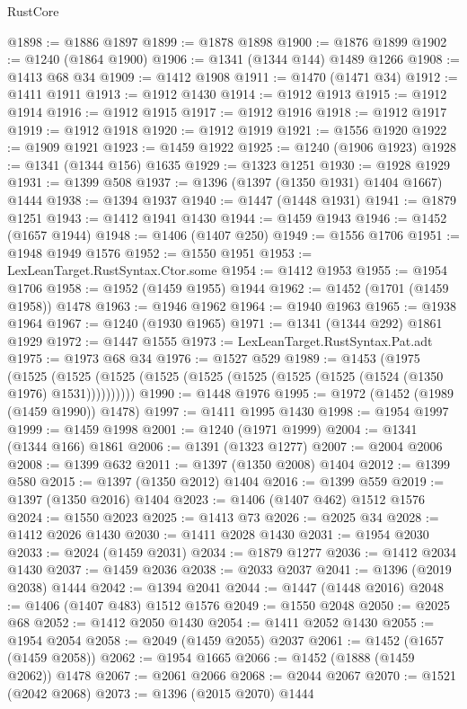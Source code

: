 \begin{lexlean}{RustCore}
\begin{coremodule}
{\begin{coremodule}
{{{{{{{{{{{{{{{{{{{{{{{{{{{{{{{{{{{{{{{{{{{{{@1898 := @1886 @1897
@1899 := @1878 @1898
@1900 := @1876 @1899
@1902 := @1240 (@1864 @1900)
@1906 := @1341 (@1344 @144) @1489 @1266
@1908 := @1413 @68 @34
@1909 := @1412 @1908
@1911 := @1470 (@1471 @34)
@1912 := @1411 @1911
@1913 := @1912 @1430
@1914 := @1912 @1913
@1915 := @1912 @1914
@1916 := @1912 @1915
@1917 := @1912 @1916
@1918 := @1912 @1917
@1919 := @1912 @1918
@1920 := @1912 @1919
@1921 := @1556 @1920
@1922 := @1909 @1921
@1923 := @1459 @1922
@1925 := @1240 (@1906 @1923)
@1928 := @1341 (@1344 @156) @1635
@1929 := @1323 @1251
@1930 := @1928 @1929
@1931 := @1399 @508
@1937 := @1396 (@1397 (@1350 @1931) @1404 @1667) @1444
@1938 := @1394 @1937
@1940 := @1447 (@1448 @1931)
@1941 := @1879 @1251
@1943 := @1412 @1941 @1430
@1944 := @1459 @1943
@1946 := @1452 (@1657 @1944)
@1948 := @1406 (@1407 @250)
@1949 := @1556 @1706
@1951 := @1948 @1949 @1576
@1952 := @1550 @1951
@1953 := LexLeanTarget.RustSyntax.Ctor.some
@1954 := @1412 @1953
@1955 := @1954 @1706
@1958 := @1952 (@1459 @1955) @1944
@1962 := @1452 (@1701 (@1459 @1958)) @1478
@1963 := @1946 @1962
@1964 := @1940 @1963
@1965 := @1938 @1964
@1967 := @1240 (@1930 @1965)
@1971 := @1341 (@1344 @292) @1861 @1929
@1972 := @1447 @1555
@1973 := LexLeanTarget.RustSyntax.Pat.adt
@1975 := @1973 @68 @34
@1976 := @1527 @529
@1989 := @1453
    (@1975
      (@1525 (@1525 (@1525 (@1525 (@1525 (@1525 (@1525 (@1525 (@1524 (@1350 @1976) @1531))))))))))
@1990 := @1448 @1976
@1995 := @1972 (@1452 (@1989 (@1459 @1990)) @1478)
@1997 := @1411 @1995 @1430
@1998 := @1954 @1997
@1999 := @1459 @1998
@2001 := @1240 (@1971 @1999)
@2004 := @1341 (@1344 @166) @1861
@2006 := @1391 (@1323 @1277)
@2007 := @2004 @2006
@2008 := @1399 @632
@2011 := @1397 (@1350 @2008) @1404
@2012 := @1399 @580
@2015 := @1397 (@1350 @2012) @1404
@2016 := @1399 @559
@2019 := @1397 (@1350 @2016) @1404
@2023 := @1406 (@1407 @462) @1512 @1576
@2024 := @1550 @2023
@2025 := @1413 @73
@2026 := @2025 @34
@2028 := @1412 @2026 @1430
@2030 := @1411 @2028 @1430
@2031 := @1954 @2030
@2033 := @2024 (@1459 @2031)
@2034 := @1879 @1277
@2036 := @1412 @2034 @1430
@2037 := @1459 @2036
@2038 := @2033 @2037
@2041 := @1396 (@2019 @2038) @1444
@2042 := @1394 @2041
@2044 := @1447 (@1448 @2016)
@2048 := @1406 (@1407 @483) @1512 @1576
@2049 := @1550 @2048
@2050 := @2025 @68
@2052 := @1412 @2050 @1430
@2054 := @1411 @2052 @1430
@2055 := @1954 @2054
@2058 := @2049 (@1459 @2055) @2037
@2061 := @1452 (@1657 (@1459 @2058))
@2062 := @1954 @1665
@2066 := @1452 (@1888 (@1459 @2062)) @1478
@2067 := @2061 @2066
@2068 := @2044 @2067
@2070 := @1521 (@2042 @2068)
@2073 := @1396 (@2015 @2070) @1444
}}}}}}}}}}}}}}}}}}}}}}}}}}}}}}}}}}}}}}}}}}}}}
\end{coremodule}}
\end{coremodule}
\end{lexlean}
